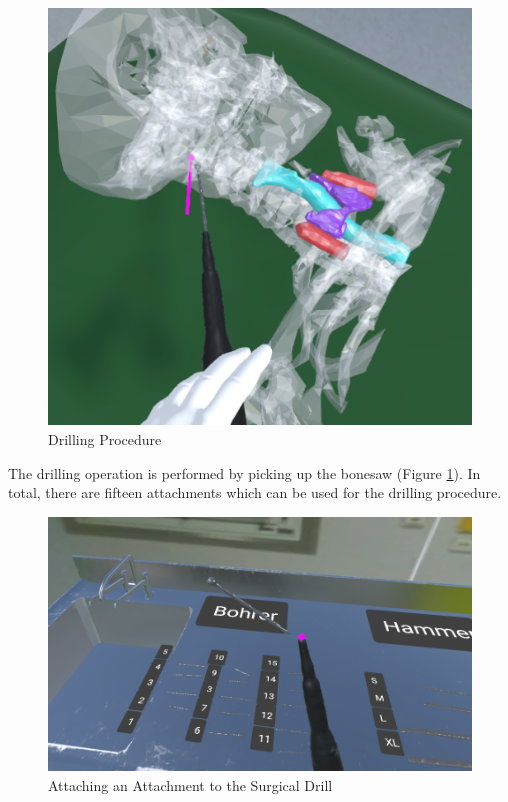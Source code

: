 \begin{figure}[ht!]
    \centering
    \includegraphics[width=\linewidth]{images/implementation/features/procedures/drilling.png}
    \caption{\label{fig::FeatureDrilling} Drilling Procedure}
\end{figure}

The drilling operation is performed by picking up the bonesaw (Figure \ref{fig::FeatureDrilling}).
In total, there are fifteen attachments which can be used for the drilling procedure.

\begin{figure}[ht!]
    \centering
    \includegraphics[width=\linewidth]{images/implementation/features/procedures/drilling_attachment.png}
    \caption{\label{fig::FeatureDrillingAttachments} Attaching an Attachment to the Surgical Drill}
\end{figure}

